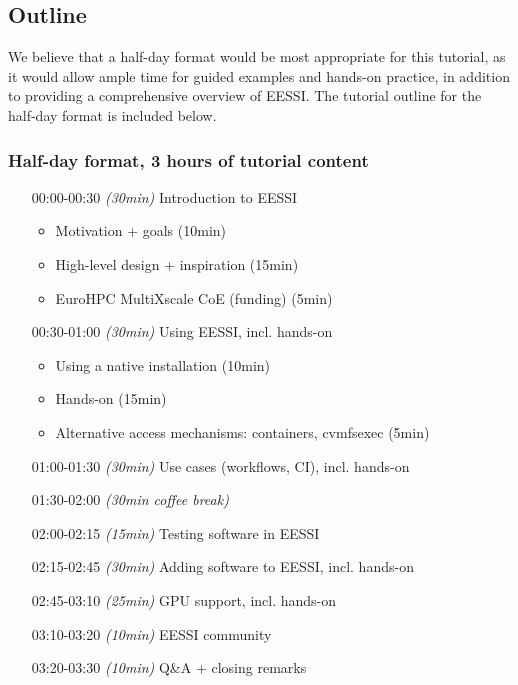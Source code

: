 
\subsection*{Outline}

We believe that a half-day format would be most appropriate for this tutorial, as it would allow ample time for guided
examples and hands-on practice, in addition to providing a comprehensive overview of EESSI. The tutorial outline for the half-day format is included below.


\subsubsection*{Half-day format, 3 hours of tutorial content}

\begin{itemize}[style=standard, labelwidth=1.9cm]


    \item [00:00-00:30] \emph{(30min)} Introduction to EESSI
     \begin{itemize}
         \item Motivation + goals (10min)
         \item High-level design + inspiration (15min)
         \item EuroHPC MultiXscale CoE (funding) (5min)
     \end{itemize}
    \item [00:30-01:00] \emph{(30min)} Using EESSI, incl. hands-on
     \begin{itemize}
         \item Using a native installation (10min)
         \item Hands-on (15min)
         \item Alternative access mechanisms: containers, cvmfsexec (5min)
     \end{itemize}
    \item [01:00-01:30] \emph{(30min)} Use cases (workflows, CI), incl. hands-on
    \item [01:30-02:00] \emph{(30min coffee break)}
    \item [02:00-02:15] \emph{(15min)} Testing software in EESSI  %
    \item [02:15-02:45] \emph{(30min)} Adding software to EESSI, incl. hands-on
    \item [02:45-03:10] \emph{(25min)} GPU support, incl. hands-on
    \item [03:10-03:20] \emph{(10min)} EESSI community
    \item [03:20-03:30] \emph{(10min)} Q\&A + closing remarks

\end{itemize}
